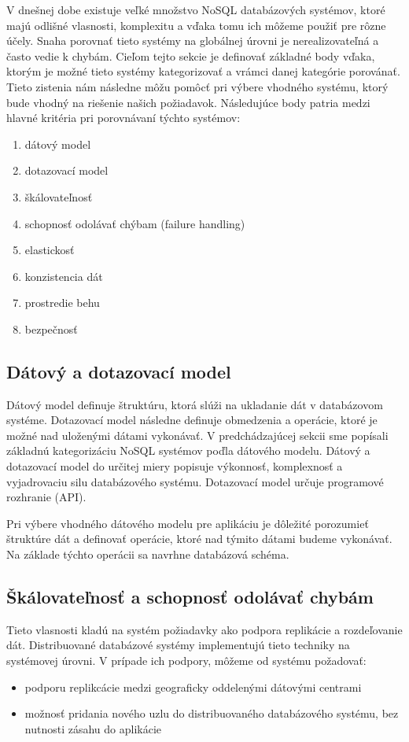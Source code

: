 \documentclass[11pt,twoside,a4paper]{book}
\begin{document}
V dnešnej dobe existuje veľké množstvo NoSQL databázových systémov, ktoré majú odlišné vlasnosti, komplexitu a vďaka tomu ich môžeme použiť pre rôzne účely. Snaha porovnať tieto systémy na globálnej úrovni je nerealizovateľná a často vedie k chybám. Cieľom tejto sekcie je definovať základné body vďaka, ktorým je možné tieto systémy kategorizovať a vrámci danej kategórie porovánať. Tieto zistenia nám následne môžu pomôcť pri výbere vhodného systému, ktorý bude vhodný na riešenie našich požiadavok. Následujúce body patria medzi hlavné kritéria pri porovnávaní týchto systémov:
\begin{enumerate}
 \item
  dátový model
 \item 
  dotazovací model
 \item
  škálovateľnosť
 \item 
  schopnosť odolávať chýbam (failure handling)
 \item
  elastickosť
 \item 
  konzistencia dát
 \item
  prostredie behu
 \item 
  bezpečnosť 
\end{enumerate}

\subsection{Dátový a dotazovací model}
Dátový model definuje štruktúru, ktorá slúži na ukladanie dát v databázovom systéme. Dotazovací model následne definuje obmedzenia a operácie, ktoré je možné nad uloženými dátami vykonávať. V predchádzajúcej sekcii sme popísali základnú kategorizáciu NoSQL systémov poďla dátového modelu. Dátový a dotazovací model do určitej miery popisuje výkonnosť, komplexnosť a vyjadrovaciu silu databázového systému. Dotazovací model určuje programové rozhranie (API).

Pri výbere vhodného dátového modelu pre aplikáciu je dôležité porozumieť štruktúre dát a definovať operácie, ktoré nad týmito dátami budeme vykonávať. Na základe týchto operácii sa navrhne databázová schéma.


\subsection{Škálovateľnosť a schopnosť odolávať chybám}
Tieto vlasnosti kladú na systém požiadavky ako podpora replikácie a rozdeľovanie dát. Distribuované databázové systémy implementujú tieto techniky na systémovej úrovni. V prípade ich podpory, môžeme od systému požadovať:
\begin{itemize}
  \item
  podporu replikcácie medzi geograficky oddelenými dátovými centrami
  \item
  možnosť pridania nového uzlu do distribuovaného databázového systému, bez nutnosti zásahu do aplikácie
\end{itemize}
\end{document}
